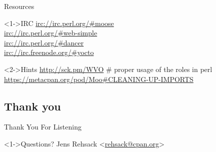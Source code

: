\documentclass[ngerman,xcolor={table,dvipsnames},smaller,compress,hyperref={bookmarks,colorlinks}]{beamer}%
\begin{document}
\begin{frame}[t,fragile]{Resources}
\begin{block}<1->{IRC}
\url{irc://irc.perl.org/#moose} \\
\url{irc://irc.perl.org/#web-simple} \\
\url{irc://irc.perl.org/#dancer} \\
\url{irc://irc.freenode.org/#yocto}
\end{block}

\begin{block}<2->{Hints}
\url{http://sck.pm/WVO} \# proper usage of the roles in perl \\
\url{https://metacpan.org/pod/Moo\#CLEANING-UP-IMPORTS}
\end{block}
\end{frame}

\subsection{Thank you}

\begin{frame}[fragile]{Thank You For Listening}
\begin{block}<1->{Questions?}
Jens Rehsack \textless{}\href{mailto:rehsack@cpan.org}{rehsack@cpan.org}\textgreater{}
\end{block}
\end{frame}
\end{document}
